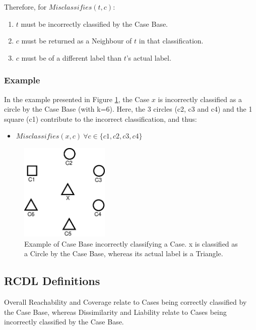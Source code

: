 \documentclass[a4paper,11pt]{report}
\begin{document}
Therefore, for $ Misclassifies(t, c) $:
\begin{enumerate}
	\item $t$ must be incorrectly classified by the Case Base.
	\item $c$ must be returned as a Neighbour of $t$ in that classification.
	\item $c$ must be of a different label than $t$'s actual label.
\end{enumerate}

\subsubsection{Example}

In the example presented in Figure \ref{fig:equaldistancemisclassifieseg}, the Case $x$ is incorrectly classified as a circle by the Case Base (with k=6). Here, the 3 circles (c2, c3 and c4) and the 1 square (c1) contribute to the incorrect classification, and thus:
\begin{itemize}
	\item $Misclassifies(x,c)~\forall c\in\{c1,c2,c3,c4\}$
\end{itemize}

\begin{figure}[h!] \centering
\includegraphics[width=120pt]{./Drawn/EqualDistanceMisclassifiesEg}
\caption{Example of Case Base incorrectly classifying a Case. x is classified as a Circle by the Case Base, whereas its actual label is a Triangle.}
\label{fig:equaldistancemisclassifieseg}
\end{figure}



\subsection{RCDL Definitions}
Overall Reachability and Coverage relate to Cases being correctly classified by the Case Base, whereas Dissimilarity and Liability relate to Cases being incorrectly classified by the Case Base.
\end{document}
